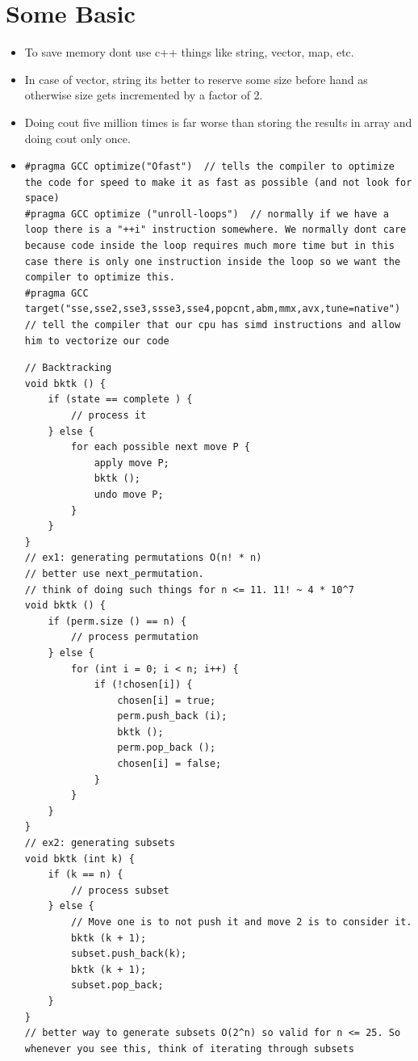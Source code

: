 \documentclass[8pt, a4paper, oneside, twocolumn]{extarticle}
\begin{document}
\section{Some Basic}
\begin{itemize}
    \item To save memory dont use c++ things like string, vector, map, etc.
    \item In case of vector, string its better to reserve some size before hand as otherwise size gets incremented by a factor of 2.
    \item Doing cout five million times is far worse than storing the results in array and doing cout only once.
    \item 
\begin{verbatim}
#pragma GCC optimize("Ofast")  // tells the compiler to optimize the code for speed to make it as fast as possible (and not look for space)
#pragma GCC optimize ("unroll-loops")  // normally if we have a loop there is a "++i" instruction somewhere. We normally dont care because code inside the loop requires much more time but in this case there is only one instruction inside the loop so we want the compiler to optimize this.
#pragma GCC target("sse,sse2,sse3,ssse3,sse4,popcnt,abm,mmx,avx,tune=native")  // tell the compiler that our cpu has simd instructions and allow him to vectorize our code
\end{verbatim}
\begin{verbatim}
// Backtracking
void bktk () {
    if (state == complete ) {
        // process it
    } else {
        for each possible next move P {
            apply move P;
            bktk ();
            undo move P;
        }
    }
}
// ex1: generating permutations O(n! * n)
// better use next_permutation. 
// think of doing such things for n <= 11. 11! ~ 4 * 10^7
void bktk () {
    if (perm.size () == n) {
        // process permutation 
    } else {
        for (int i = 0; i < n; i++) {
            if (!chosen[i]) {
                chosen[i] = true;
                perm.push_back (i);
                bktk ();
                perm.pop_back ();
                chosen[i] = false;
            }
        }
    }
}
// ex2: generating subsets
void bktk (int k) {
    if (k == n) {
        // process subset
    } else {
        // Move one is to not push it and move 2 is to consider it.
        bktk (k + 1);
        subset.push_back(k);
        bktk (k + 1);
        subset.pop_back;
    }
}
// better way to generate subsets O(2^n) so valid for n <= 25. So whenever you see this, think of iterating through subsets

\end{verbatim}
\end{itemize}
\end{document}

